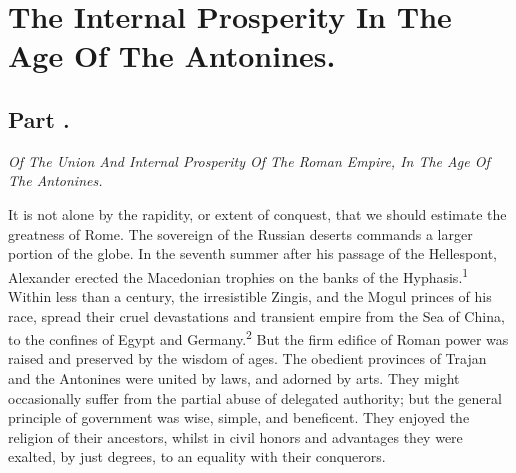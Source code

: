 \chapter{The Internal Prosperity In The Age Of The Antonines.}
\section{Part \thesection.}

\textit{Of The Union And Internal Prosperity Of The Roman Empire, In The
Age Of The Antonines.}
\vspace{\onelineskip}

It is not alone by the rapidity, or extent of conquest, that we
should estimate the greatness of Rome. The sovereign of the
Russian deserts commands a larger portion of the globe. In the
seventh summer after his passage of the Hellespont, Alexander
erected the Macedonian trophies on the banks of the Hyphasis.\textsuperscript{1}
Within less than a century, the irresistible Zingis, and the
Mogul princes of his race, spread their cruel devastations and
transient empire from the Sea of China, to the confines of Egypt
and Germany.\textsuperscript{2} But the firm edifice of Roman power was raised and
preserved by the wisdom of ages. The obedient provinces of Trajan
and the Antonines were united by laws, and adorned by arts. They
might occasionally suffer from the partial abuse of delegated
authority; but the general principle of government was wise,
simple, and beneficent. They enjoyed the religion of their
ancestors, whilst in civil honors and advantages they were
exalted, by just degrees, to an equality with their conquerors.


